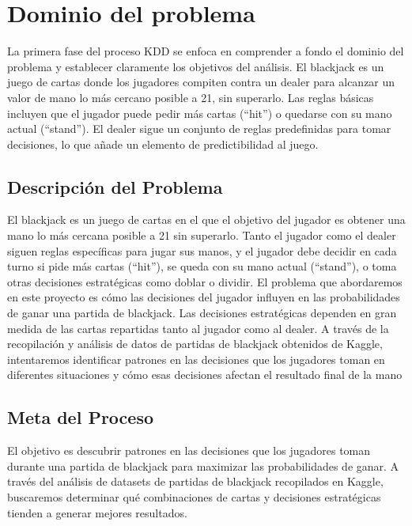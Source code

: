 \documentclass[conference,final,]{IEEEtran}
\begin{document}
\section{Dominio del problema}\label{dominio-del-problema}

La primera fase del proceso KDD se enfoca en comprender a fondo el
dominio del problema y establecer claramente los objetivos del análisis.
El blackjack es un juego de cartas donde los jugadores compiten contra
un dealer para alcanzar un valor de mano lo más cercano posible a 21,
sin superarlo. Las reglas básicas incluyen que el jugador puede pedir
más cartas (``hit'') o quedarse con su mano actual (``stand''). El
dealer sigue un conjunto de reglas predefinidas para tomar decisiones,
lo que añade un elemento de predictibilidad al juego.

\subsection{Descripción del Problema}\label{descripciuxf3n-del-problema}

El blackjack es un juego de cartas en el que el objetivo del jugador es
obtener una mano lo más cercana posible a 21 sin superarlo. Tanto el
jugador como el dealer siguen reglas específicas para jugar sus manos, y
el jugador debe decidir en cada turno si pide más cartas (``hit''), se
queda con su mano actual (``stand''), o toma otras decisiones
estratégicas como doblar o dividir. El problema que abordaremos en este
proyecto es cómo las decisiones del jugador influyen en las
probabilidades de ganar una partida de blackjack. Las decisiones
estratégicas dependen en gran medida de las cartas repartidas tanto al
jugador como al dealer. A través de la recopilación y análisis de datos
de partidas de blackjack obtenidos de Kaggle, intentaremos identificar
patrones en las decisiones que los jugadores toman en diferentes
situaciones y cómo esas decisiones afectan el resultado final de la mano

\subsection{Meta del Proceso}\label{meta-del-proceso}

El objetivo es descubrir patrones en las decisiones que los jugadores
toman durante una partida de blackjack para maximizar las probabilidades
de ganar. A través del análisis de datasets de partidas de blackjack
recopilados en Kaggle, buscaremos determinar qué combinaciones de cartas
y decisiones estratégicas tienden a generar mejores resultados.
\end{document}

